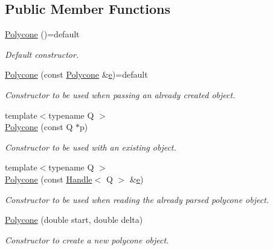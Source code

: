 \subsection*{Public Member Functions}
\begin{DoxyCompactItemize}
\item 
\hyperlink{class_d_d4hep_1_1_geometry_1_1_polycone_a388e0ce73b138c4c50225e625d9cf968}{Polycone} ()=default
\begin{DoxyCompactList}\small\item\em Default constructor. \end{DoxyCompactList}\item 
\hyperlink{class_d_d4hep_1_1_geometry_1_1_polycone_a92909385cdc93e861ae3b025fa6fb712}{Polycone} (const \hyperlink{class_d_d4hep_1_1_geometry_1_1_polycone}{Polycone} \&\hyperlink{_volumes_8cpp_a8a9a1f93e9b09afccaec215310e64142}{e})=default
\begin{DoxyCompactList}\small\item\em Constructor to be used when passing an already created object. \end{DoxyCompactList}\item 
{\footnotesize template$<$typename Q $>$ }\\\hyperlink{class_d_d4hep_1_1_geometry_1_1_polycone_a0b335f33b91bb7eb992effd16cf3e03b}{Polycone} (const Q $\ast$p)
\begin{DoxyCompactList}\small\item\em Constructor to be used with an existing object. \end{DoxyCompactList}\item 
{\footnotesize template$<$typename Q $>$ }\\\hyperlink{class_d_d4hep_1_1_geometry_1_1_polycone_ae8cdcc08d6f8aa832af979e7b84be5ed}{Polycone} (const \hyperlink{class_d_d4hep_1_1_handle}{Handle}$<$ Q $>$ \&\hyperlink{_volumes_8cpp_a8a9a1f93e9b09afccaec215310e64142}{e})
\begin{DoxyCompactList}\small\item\em Constructor to be used when reading the already parsed polycone object. \end{DoxyCompactList}\item 
\hyperlink{class_d_d4hep_1_1_geometry_1_1_polycone_aee9015113e47313a9b382ed7ce0ec63b}{Polycone} (double start, double delta)
\begin{DoxyCompactList}\small\item\em Constructor to create a new polycone object. \end{DoxyCompactList}\item 

\end{DoxyCompactItemize}
